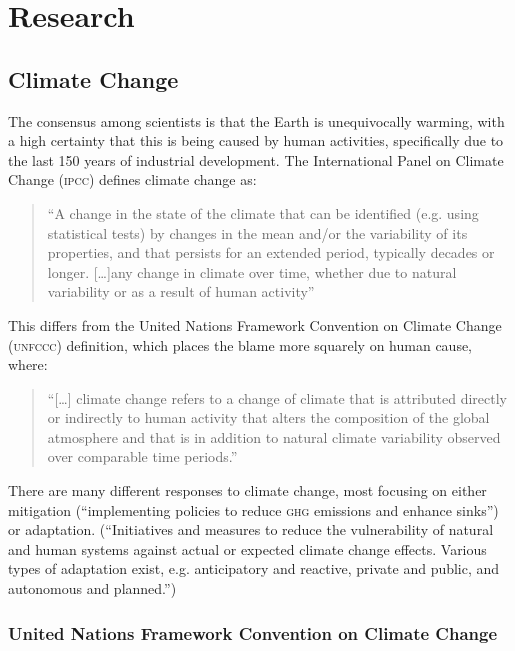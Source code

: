 \section{Research}
\subsection{Climate Change}
The consensus among scientists is that the Earth is unequivocally warming, with a high certainty that this is being caused by human activities, specifically due to the last 150 years of industrial development. The International Panel on Climate Change (\textsc{ipcc}) defines climate change as:

\begin{quote}
``A change in the state of the climate that can be identified (e.g. using statistical tests) by changes in the mean and/or the variability of its properties, and that persists for an extended period, typically decades or longer. [\ldots]any change in climate over time, whether due to natural variability or as a result of human activity''~\cite{IPCC-synthesis-07}
\end{quote}

This differs from the United Nations Framework Convention on Climate Change (\textsc{unfccc}) definition, which places the blame more squarely on human cause, where:

\begin{quote}
``[\ldots] climate change refers to a change of climate that is attributed directly or indirectly to human activity that alters the composition of the global atmosphere and that is in addition to natural climate variability observed over comparable time periods.''~\cite{IPCC-synthesis-07}
\end{quote}

There are many different responses to climate change, most focusing on either mitigation (``implementing policies to reduce \textsc{ghg} emissions and enhance sinks'')~\cite{IPCC-glossary-mitigation} or adaptation. (``Initiatives and measures to reduce the vulnerability of natural and human systems against actual or expected climate change effects. Various types of adaptation exist, e.g. anticipatory and reactive, private and public, and autonomous and planned.'')~\cite{IPCC-glossary-adaptation}

\subsubsection{United Nations Framework Convention on Climate Change}

